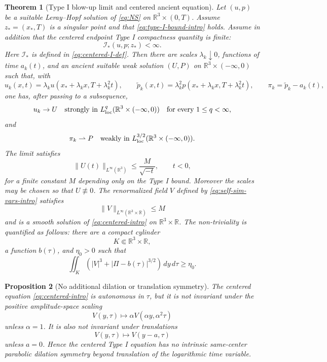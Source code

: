 \documentclass[11pt]{amsart}
\theoremstyle{plain}
\newtheorem{theorem}{Theorem}[section]
\newtheorem{proposition}[theorem]{Proposition}
\theoremstyle{definition}
\theoremstyle{remark}
\numberwithin{equation}{section}
\newcommand{\R}{\mathbb R}
\newcommand{\loc}{\mathrm{loc}}
\newcommand{\calI}{\mathcal I}
\begin{document}
\begin{theorem}[Type I blow-up limit and centered ancient equation]
\label{thm:main}
Let \((u,p)\) be a suitable Leray--Hopf solution of \eqref{eq:NS} on
\(\R^3\times(0,T)\).  Assume \(z_*=(x_*,T)\) is a singular point and that
\eqref{eq:type-I-bound-intro} holds.  Assume in addition that the centered
endpoint Type I compactness quantity is finite:
\begin{equation}\label{eq:centered-endpoint-I-main}
   \calI_*(u,p;z_*)<\infty .
\end{equation}
Here \(\calI_*\) is defined in \eqref{eq:centered-I-def}.
Then there are scales
\(\lambda_k\downarrow0\), functions of time \(a_k(t)\), and an ancient
suitable weak solution \((U,P)\) on \(\R^3\times(-\infty,0)\) such that, with
\[
   u_k(x,t)=\lambda_k u(x_*+\lambda_k x,T+\lambda_k^2t),
   \qquad
   \widetilde p_k(x,t)=\lambda_k^2p(x_*+\lambda_k x,T+\lambda_k^2t),
   \qquad
   \pi_k=\widetilde p_k-a_k(t),
\]
one has, after passing to a subsequence,
\[
   u_k\to U \quad\hbox{strongly in } L^q_{\loc}(\R^3\times(-\infty,0))
   \quad\hbox{for every }1\le q<\infty,
\]
and
\[
   \pi_k\rightharpoonup P
   \quad\hbox{weakly in }L^{3/2}_{\loc}(\R^3\times(-\infty,0)).
\]
The limit satisfies
\begin{equation}\label{eq:ancient-type-I-bound}
   \|U(t)\|_{L^\infty(\R^3)}
   \le \frac{M}{\sqrt{-t}},
   \qquad t<0,
\end{equation}
for a finite constant \(M\) depending only on the Type I bound.  Moreover the
scales may be chosen so that \(U\not\equiv0\).  The renormalized field \(V\)
defined by \eqref{eq:self-sim-vars-intro} satisfies
\[
   \|V\|_{L^\infty(\R^3\times\R)}\le M
\]
and is a smooth solution of \eqref{eq:centered-intro} on \(\R^3\times\R\).
The non-triviality is quantified as follows: there are a compact cylinder
\[
   K\Subset \R^3\times\R,
\]
a function \(b(\tau)\), and \(\eta_0>0\) such that
\begin{equation}\label{eq:main-nonzero-renorm}
   \iint_K\left(|V|^3+|\Pi-b(\tau)|^{3/2}\right)\,dy\,d\tau\ge\eta_0 .
\end{equation}
\end{theorem}

\begin{proposition}[No additional dilation or translation symmetry]
\label{prop:no-cascade}
The centered equation \eqref{eq:centered-intro} is autonomous in \(\tau\), but
it is not invariant under the positive amplitude-space scaling
\[
   V(y,\tau)\mapsto \alpha V(\alpha y,\alpha^2\tau)
\]
unless \(\alpha=1\).  It is also not invariant under translations
\[
   V(y,\tau)\mapsto V(y-a,\tau)
\]
unless \(a=0\).  Hence the centered Type I equation has no intrinsic
same-center parabolic dilation symmetry beyond translation of the logarithmic
time variable.
\end{proposition}
\end{document}
